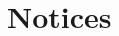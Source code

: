 \documentclass[english,11pt,twoside,toc=bib,toc=idx]{scrreprt}
\newcommand{\ARCH}{z/\kern-1pt Ar\-chi\-tec\-ture}
\newcommand{\ARCH}{ESA/390}
\begin{document}
\appendix

\chapter{Notices}


\newcommand{\bibTitle}[1]{``#1''}

\begin{thebibliography}{9}
\end{thebibliography}

\printindex
\end{document}
